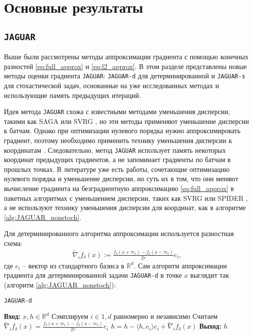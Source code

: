 \section{Основные результаты}

\subsection{\texttt{JAGUAR}} \label{section:JAGUAR}
    
    Выше были рассмотрены методы аппроксимации градиента с помощью конечных разностей \eqref{eq:full_approx} и \eqref{eq:l2_approx}. В этом разделе представлены новые методы оценки градиента \texttt{JAGUAR}: \texttt{JAGUAR-d} для детерминированной и \texttt{JAGUAR-s} для стохастической задач, основанные на уже исследованных методах и использующие память предыдущих итераций.
    
    Идея метода \texttt{JAGUAR} схожа с известными методами уменьшения дисперсии, такими как SAGA \cite{defazio2014saga} или SVRG \cite{johnson2013accelerating}, но эти методы применяют уменьшение дисперсии к батчам. Однако при оптимизации нулевого порядка нужно аппроксимировать градиент, поэтому необходимо применить технику уменьшения дисперсии к координатам \cite{hanzely2018sega}. Следовательно, метод \texttt{JAGUAR} использует память некоторых координат предыдущих градиентов, а не запоминает градиенты по батчам в прошлых точках. В литературе уже есть работы, сочетающие оптимизацию нулевого порядка и уменьшение дисперсии, но суть их в том, что они меняют вычисление градиента на безградиентную аппроксимацию \eqref{eq:full_approx} в пакетных алгоритмах с уменьшением дисперсии, таких как SVRG или SPIDER \cite{ji2019improved}, а не используют технику уменьшения дисперсии для координат, как в алгоритме \ref{alg:JAGUAR_nonstoch}.  
    
    Для детерминированного алгоритма аппроксимации используется разностная схема:
    \begin{align} \label{eq:opf_nonstoch}
        \widetilde{\nabla}_i f_\delta (x) :=  \frac{f_\delta (x + \tau e_i) - f_\delta (x - \tau e_i)}{2 \tau} e_i,
    \end{align}
    где $e_i$ -- вектор из стандартного базиса в $\mathbb{R}^d$. Сам алгоритм аппроксимации градиента для детерминированной задачи \texttt{JAGUAR-d} в точке $x$ выглядит так (алгоритм \ref{alg:JAGUAR_nonstoch}):

    \begin{algorithm}[H]
        \caption{\texttt{JAGUAR-d}} \label{alg:JAGUAR_nonstoch}
        \begin{algorithmic}[1]
            \State \textbf{Вход:} $x, h \in \mathbb{R}^d$
            \State Сэмплируем $i \in \overline{1, d}$ равномерно и независимо
            \State Считаем $\widetilde{\nabla}_i f_\delta (x) = \frac{f_\delta (x + \tau e_i) - f_\delta (x - \tau e_i)}{2 \tau} e_i$
            \State $h = h - \langle h, e_i \rangle e_i + \widetilde{\nabla}_i f_\delta (x)$
            \State \textbf{Выход:} $h$
        \end{algorithmic}
    \end{algorithm}

